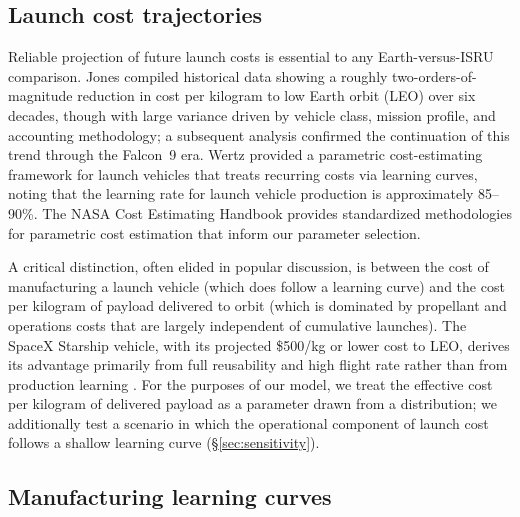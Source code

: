 \documentclass[preprint,12pt]{elsarticle}
\begin{document}
\subsection{Launch cost trajectories}

Reliable projection of future launch costs is essential to any Earth-versus-ISRU comparison. Jones \cite{jones2018} compiled historical data showing a roughly two-orders-of-magnitude reduction in cost per kilogram to low Earth orbit (LEO) over six decades, though with large variance driven by vehicle class, mission profile, and accounting methodology; a subsequent analysis \cite{jones2020} confirmed the continuation of this trend through the Falcon~9 era. Wertz \cite{wertz2011} provided a parametric cost-estimating framework for launch vehicles that treats recurring costs via learning curves, noting that the learning rate for launch vehicle production is approximately 85--90\%. The NASA Cost Estimating Handbook \cite{nasa2015handbook} provides standardized methodologies for parametric cost estimation that inform our parameter selection.

A critical distinction, often elided in popular discussion, is between the cost of manufacturing a launch vehicle (which does follow a learning curve) and the cost per kilogram of payload delivered to orbit (which is dominated by propellant and operations costs that are largely independent of cumulative launches). The SpaceX Starship vehicle, with its projected \$500/kg or lower cost to LEO, derives its advantage primarily from full reusability and high flight rate rather than from production learning \cite{spacex2023,jones2020}. For the purposes of our model, we treat the effective cost per kilogram of delivered payload as a parameter drawn from a distribution; we additionally test a scenario in which the operational component of launch cost follows a shallow learning curve (\S\ref{sec:sensitivity}).

\subsection{Manufacturing learning curves}
\end{document}
